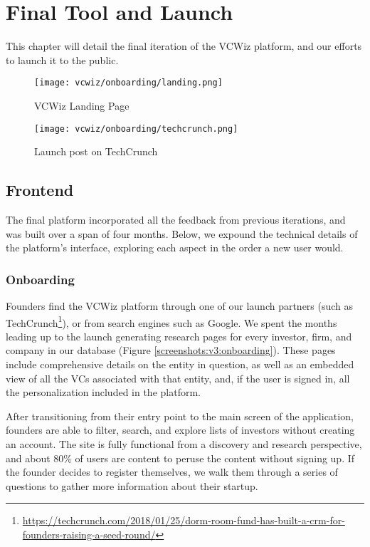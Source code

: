 \chapter{Final Tool and Launch}
\label{ch:ch4}

This chapter will detail the final iteration of the VCWiz platform, and our efforts to launch it to the public.

\begin{figure}[ht]
  \centering
  \begin{minipage}[t]{0.45\textwidth}
    \centering
    \texttt{[image: vcwiz/onboarding/landing.png]}
    \caption*{VCWiz Landing Page}
  \end{minipage}\hfill
  \begin{minipage}[t]{0.45\textwidth}
    \centering
    \texttt{[image: vcwiz/onboarding/techcrunch.png]}
    \caption*{Launch post on TechCrunch}
  \end{minipage}
\end{figure}

\section{Frontend}

The final platform incorporated all the feedback from previous iterations, and was built over a span of four months. Below, we expound the technical details of the platform's interface, exploring each aspect in the order a new user would.

\subsection{Onboarding}

Founders find the VCWiz platform through one of our launch partners (such as TechCrunch\footnote{\url{https://techcrunch.com/2018/01/25/dorm-room-fund-has-built-a-crm-for-founders-raising-a-seed-round/}}), or from search engines such as Google. We spent the months leading up to the launch generating research pages for every investor, firm, and company in our database (Figure \ref{screenshots:v3:onboarding}). These pages include comprehensive details on the entity in question, as well as an embedded view of all the VCs associated with that entity, and, if the user is signed in, all the personalization included in the platform.

After transitioning from their entry point to the main screen of the application, founders are able to filter, search, and explore lists of investors without creating an account. The site is fully functional from a discovery and research perspective, and about 80\% of users are content to peruse the content without signing up. If the founder decides to register themselves, we walk them through a series of questions to gather more information about their startup.

